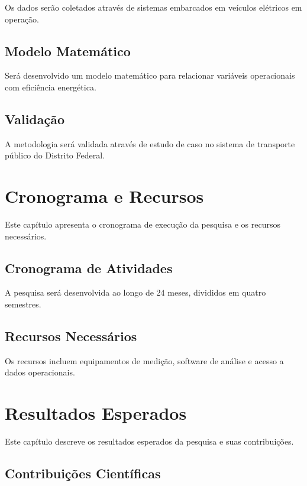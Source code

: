 \documentclass[qualificacao-mestrado,onehalfspacing,12pt,hyperref]{UnB-PPGT}
\begin{document}
Os dados serão coletados através de sistemas embarcados em veículos elétricos em operação.

\section{Modelo Matemático}
\label{sec:modelo}

Será desenvolvido um modelo matemático para relacionar variáveis operacionais com eficiência energética.

\section{Validação}
\label{sec:validacao}

A metodologia será validada através de estudo de caso no sistema de transporte público do Distrito Federal.

\chapter{Cronograma e Recursos}
\label{cap:cronograma}

Este capítulo apresenta o cronograma de execução da pesquisa e os recursos necessários.

\section{Cronograma de Atividades}
\label{sec:cronograma-atividades}

A pesquisa será desenvolvida ao longo de 24 meses, divididos em quatro semestres.

\section{Recursos Necessários}
\label{sec:recursos}

Os recursos incluem equipamentos de medição, software de análise e acesso a dados operacionais.

\chapter{Resultados Esperados}
\label{cap:resultados}

Este capítulo descreve os resultados esperados da pesquisa e suas contribuições.

\section{Contribuições Científicas}
\label{sec:contribuicoes}
\end{document}
